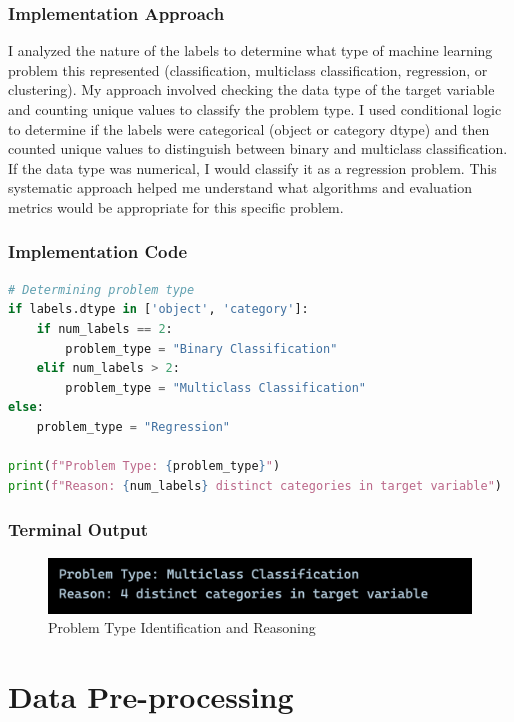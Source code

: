 \documentclass[12pt,a4paper]{article}
\begin{document}
\subsubsection{Implementation Approach}
I analyzed the nature of the labels to determine what type of machine learning problem this represented (classification, multiclass classification, regression, or clustering). My approach involved checking the data type of the target variable and counting unique values to classify the problem type. I used conditional logic to determine if the labels were categorical (object or category dtype) and then counted unique values to distinguish between binary and multiclass classification. If the data type was numerical, I would classify it as a regression problem. This systematic approach helped me understand what algorithms and evaluation metrics would be appropriate for this specific problem.

\subsubsection{Implementation Code}
\begin{lstlisting}[language=Python, caption=Problem Type Identification and Reasoning]
# Determining problem type
if labels.dtype in ['object', 'category']:
    if num_labels == 2:
        problem_type = "Binary Classification"
    elif num_labels > 2:
        problem_type = "Multiclass Classification"
else:
    problem_type = "Regression"

print(f"Problem Type: {problem_type}")
print(f"Reason: {num_labels} distinct categories in target variable")
\end{lstlisting}

\subsubsection{Terminal Output}

\begin{figure}[h!]
\centering
    \includegraphics[width=\textwidth]{Figures/problem_type_output.png}
    \caption{Problem Type Identification and Reasoning}
\end{figure}

\section{Data Pre-processing}
\end{document}
